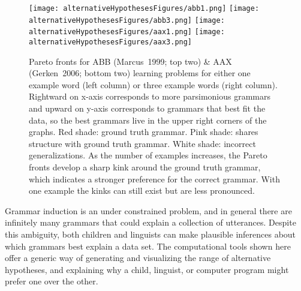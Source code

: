 \documentclass{article}
\begin{document}
\begin{figure}[htbp]

\texttt{[image: alternativeHypothesesFigures/abb1.png]} \texttt{[image: alternativeHypothesesFigures/abb3.png]}
\texttt{[image: alternativeHypothesesFigures/aax1.png]} \texttt{[image: alternativeHypothesesFigures/aax3.png]}
  
  \caption{Pareto fronts for ABB  (Marcus~1999; top two) \& AAX  (Gerken~2006; bottom two) learning problems for either one example word (left column) or three example words  (right column). Rightward on x-axis corresponds to more parsimonious grammars and upward on y-axis corresponds to grammars that best fit the data, so the best grammars live in the upper right corners of the graphs. {\color{red}Red shade}: ground truth grammar. {\color{red!60}Pink shade}: shares structure with ground truth grammar. White shade: incorrect generalizations. As the number of examples increases, the Pareto fronts develop a sharp kink around the ground truth grammar, which indicates a stronger preference for the correct grammar. With one example the kinks can still exist but are less pronounced.}\label{quadrupleFrontier}
\end{figure}


Grammar induction is an under constrained problem, and in general there are infinitely many grammars that could explain a collection of utterances. Despite this ambiguity, both children and linguists can make plausible inferences about which grammars best explain a data set. The computational tools shown here offer a generic way of generating and visualizing the range of alternative hypotheses, and explaining why a child, linguist, or computer program might prefer one over the other.
\end{document}
